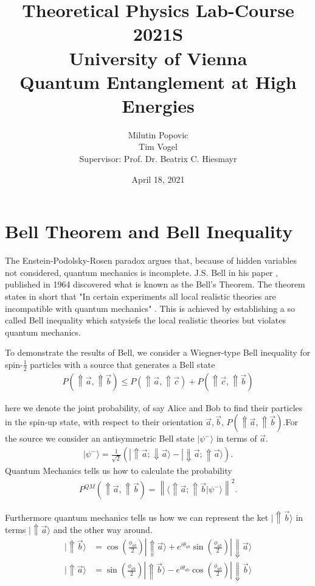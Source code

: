 \documentclass[a4paper]{article}
\title{Theoretical Physics Lab-Course 2021S\\ University of Vienna \vspace{1.25cm}\\
Quantum Entanglement at High Energies}
\author{Milutin Popovic \\ Tim Vogel \vspace{1cm}\\ Supervisor: Prof. Dr. Beatrix C.
Hiesmayr}
\date{April 18, 2021}
\begin{document}
\maketitle
\tableofcontents

\section{Bell Theorem and Bell Inequality}
The Enstein-Podolsky-Rosen paradox argues that, because of hidden variables
not considered, quantum mechanics is incomplete. J.S. Bell in his paper \cite{bell},
published in 1964 discovered what is known as the Bell's Theorem. The theorem
states in short that "In certain experiments all local realistic theories are
incompatible with quantum mechanics" \cite{bell}. This is achieved by
establishing a so called Bell inequality which satysiefs the local realistic
theories but violates quantum mechanics.

To demonstrate the results of Bell, we consider a Wiegner-type Bell inequality
for spin-$\frac{1}{2}$ particles with a source that generates a Bell state
\begin{align}\label{eq:wtb}
    P(\Uparrow \vec{a}, \Uparrow \vec{b}) \leq
    P(\Uparrow \vec{a}, \Uparrow \vec{c}) + P(\Uparrow \vec{c}, \Uparrow \vec{b})
\end{align}

here we denote the joint probability, of say Alice and Bob to find their
particles in the spin-up state, with respect to their orientation $\vec{a},
\vec{b}$, $P(\Uparrow \vec{a}, \Uparrow \vec{b})$.For the source we consider
an antisymmetric Bell state $|\psi ^-\rangle$ in terms of $\vec{a}$.
\begin{align}
    |\psi ^-\rangle = \frac{1}{\sqrt{2}}(|\Uparrow \vec{a}; \Downarrow
    \vec{a}\rangle - |\Downarrow \vec{a}; \Uparrow \vec{a}\rangle).
\end{align}
Quantum Mechanics tells us how to calculate the probability
\begin{align}\label{eq:prob}
    P^{QM}(\Uparrow \vec{a}, \Uparrow \vec{b}) = \left\|\langle\Uparrow \vec{a}; \Uparrow
    \vec{b}|\psi ^-\rangle \right\|^2.
\end{align}

Furthermore quantum mechanics tells us how we can represent the ket
$|\Uparrow \vec{b}\rangle$ in terms $|\Uparrow \vec{a}\rangle$ and the other
way around.
\begin{align}
    |\Uparrow \vec{b}\rangle &= \cos(\frac{\phi_{ab}}{2})|\Uparrow
    \vec{a}\rangle + e^{i\theta_{ab}} \sin(\frac{\phi_{ab}}{2})|\Downarrow
    \vec{a}\rangle\\
    |\Uparrow \vec{a}\rangle &= \sin(\frac{\phi_{ab}}{2})|\Uparrow
    \vec{b}\rangle - e^{i\theta_{ab}} \cos(\frac{\phi_{ab}}{2})|\Downarrow
    \vec{b}\rangle
\end{align}
\end{document}

